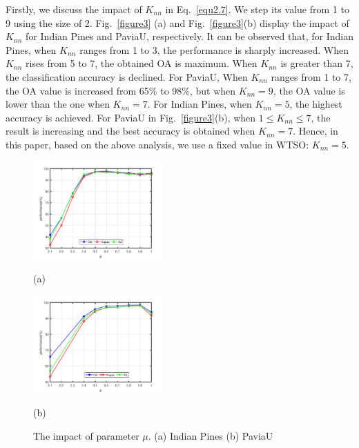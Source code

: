 \documentclass{ws-ijwmip}
\begin{document}
Firstly, we discuss the impact of $K_{nn}$ in Eq.~\ref{equ2.7}. We step its value from 1 to 9 using the size of 2. Fig.~\ref{figure3} (a) and Fig.~\ref{figure3}(b) display the impact of $K_{nn}$ for Indian Pines and PaviaU, respectively. 
It can be observed that, for Indian Pines, when $K_{nn}$ ranges from 1 to 3, the performance is sharply increased. 
When $K_{nn}$ rises from 5 to 7, the obtained OA is maximum. When $K_{nn}$ is greater than 7, the classification accuracy is declined. 
For PaviaU, When $K_{nn}$ ranges from 1 to 7, the OA value is increased from 65\% to 98\%, but when $K_{nn}=9$, the OA value is lower than the one when $K_{nn}=7$. 
For Indian Pines, when $K_{nn} = 5$, the highest accuracy is achieved. For PaviaU in Fig.~\ref{figure3}(b), when $1 \leqslant  K_{nn} \leqslant 7$, the result is increasing and the best accuracy is obtained when $K_{nn}=7$.
Hence, in this paper, based on the above analysis, we use a fixed value in WTSO: $K_{nn}=5$.
\begin{figure}[bh]
        \centering
        \begin{minipage}[b]{0.45\linewidth}
            \centering
            \centerline{
            \includegraphics[width=5cm ]{image/IndianPines_miu}}
            \centerline{(a)}
            \medskip
        \end{minipage}
        \begin{minipage}[b]{0.45\linewidth}
            \centering
            \centerline{
            \includegraphics[width=5cm ]{image/paviaU_miu}}
            \centerline{(b)}
            \medskip
        \end{minipage}
        \caption{The impact of parameter $\mu$. (a) Indian Pines  (b) PaviaU}
        \label{figure4}
    \end{figure}
\end{document}
